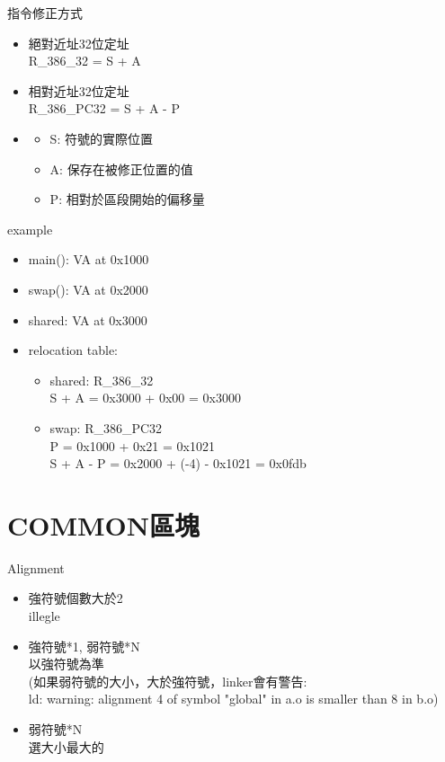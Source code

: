 \begin{frame}{指令修正方式}
    \begin{itemize}
        \item 絕對近址32位定址\\
            R\_386\_32 = S + A
        \item 相對近址32位定址\\
            R\_386\_PC32 = S + A - P
        \item 
        \begin{itemize}
            \item S: 符號的實際位置
            \item A: 保存在被修正位置的值
            \item P: 相對於區段開始的偏移量
        \end{itemize}
    \end{itemize}
\end{frame}


\begin{frame}{example}
    \begin{itemize}
        \item main(): VA at 0x1000
        \item swap(): VA at 0x2000
        \item shared: VA at 0x3000
        \item relocation table:
            \begin{itemize}
                \item shared: R\_386\_32\\
                   S + A = 0x3000 + 0x00 = 0x3000
                \item swap: R\_386\_PC32\\
                   P = 0x1000 + 0x21 = 0x1021\\
                   S + A - P = 0x2000 + (-4) - 0x1021 = 0x0fdb
            \end{itemize}
    \end{itemize}
\end{frame}

\section{COMMON區塊}

\begin{frame}{Alignment}
    \begin{itemize}
        \item 強符號個數大於2\\
            illegle
        \item 強符號*1, 弱符號*N\\
            以強符號為準\\
            (如果弱符號的大小，大於強符號，linker會有警告:\\
            ld: warning: alignment 4 of symbol "global" in a.o is smaller
            than 8 in b.o)
        \item 弱符號*N\\
            選大小最大的
    \end{itemize}
\end{frame}


